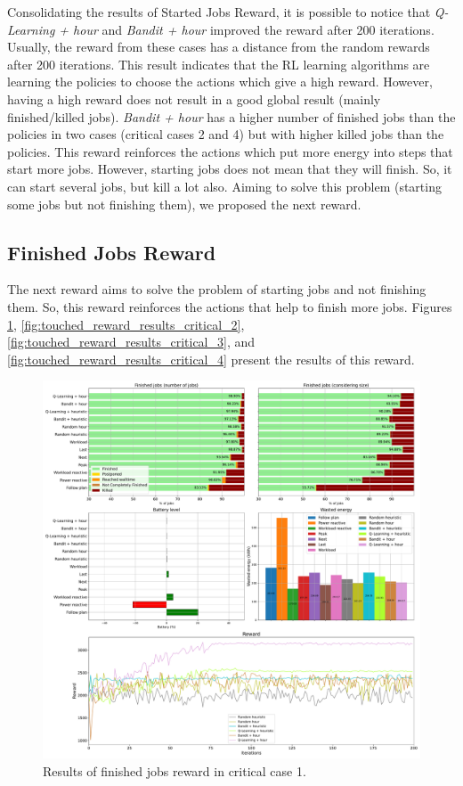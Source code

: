 Consolidating the results of Started Jobs Reward, it is possible to notice that \emph{Q-Learning + hour} and \emph{Bandit + hour} improved the reward after 200 iterations. Usually, the reward from these cases has a distance from the random rewards after 200 iterations. This result indicates that the RL learning algorithms are learning the policies to choose the actions which give a high reward. However, having a high reward does not result in a good global result (mainly finished/killed jobs). \emph{Bandit + hour} has a higher number of finished jobs than the policies in two cases (critical cases 2 and 4) but with higher killed jobs than the policies. This reward reinforces the actions which put more energy into steps that start more jobs. However, starting jobs does not mean that they will finish. So, it can start several jobs, but kill a lot also. Aiming to solve this problem (starting some jobs but not finishing them), we proposed the next reward.

\subsection{Finished Jobs Reward}

The next reward aims to solve the problem of starting jobs and not finishing them. So, this reward reinforces the actions that help to finish more jobs. Figures \ref{fig:touched_reward_results_critical_1}, \ref{fig:touched_reward_results_critical_2}, \ref{fig:touched_reward_results_critical_3}, and \ref{fig:touched_reward_results_critical_4} present the results of this reward.

\begin{figure}[!htb]
    \centering
    \includegraphics[scale=0.29]{Images/Learning_compensations/reward_finished_touched_profile_best_workload_1_with_noise_state_delta.pdf}
    \caption{Results of finished jobs reward in critical case 1.}
    \label{fig:touched_reward_results_critical_1}
\end{figure}

